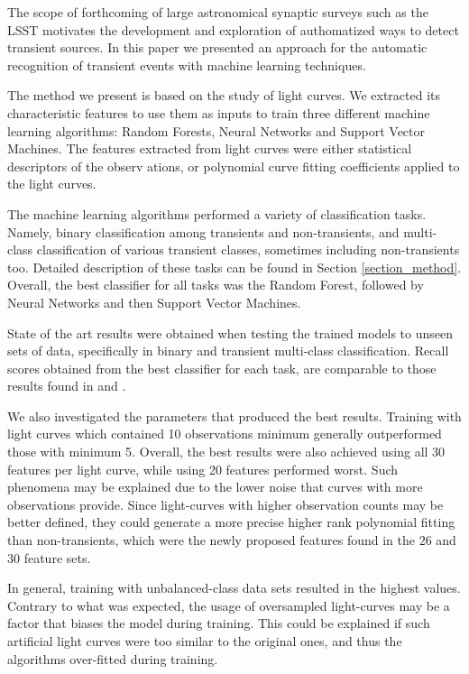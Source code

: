 The scope of forthcoming of large astronomical synaptic surveys such
as the LSST \citep{0805.2366} motivates the development and
exploration of authomatized ways to detect transient sources.
In this paper we presented an approach for the automatic recognition of transient
events with machine learning techniques. 

The method we present is based on the study of light curves. 
We extracted its characteristic features to use them as inputs
to train three different machine learning algorithms: Random Forests,
Neural Networks and Support Vector Machines.
The features extracted from light curves were either statistical
descriptors of the observ ations, or polynomial curve fitting
coefficients applied to the light curves.   

The machine learning algorithms performed a variety of classification tasks.
Namely, binary classification among transients and non-transients, and
multi-class classification of various transient classes, sometimes
including non-transients too. Detailed description of these tasks can
be found in Section \ref{section_method}.  
Overall, the best classifier for all tasks was the Random Forest,
followed by Neural Networks and then Support Vector Machines. 

State of the art results were obtained when testing the trained models
to unseen sets of data, specifically in binary and transient
multi-class classification. 
Recall scores obtained from the best classifier for each task, are
comparable to those results found in \cite{1401.3211}
and \cite{1601.03931}.   


We also investigated the parameters that produced the best results.
Training with light curves which contained 10 observations minimum
generally outperformed those with minimum 5. 
Overall, the best results were also achieved using all 30 features per
light curve, while using 20 features performed worst. 
Such phenomena may be explained due to the lower noise that curves
with more observations provide.  
Since light-curves with higher observation counts may be better
defined, they could generate a more precise higher rank polynomial
fitting than non-transients, which were the newly proposed features
found in the 26 and 30 feature sets. 

In general, training with unbalanced-class data sets resulted in the
highest values. 
Contrary to what was expected, the usage of oversampled light-curves
may be a factor that biases the model during training. 
This could be explained if such artificial light curves were too
similar to the original ones, and thus the algorithms over-fitted
during training.  

